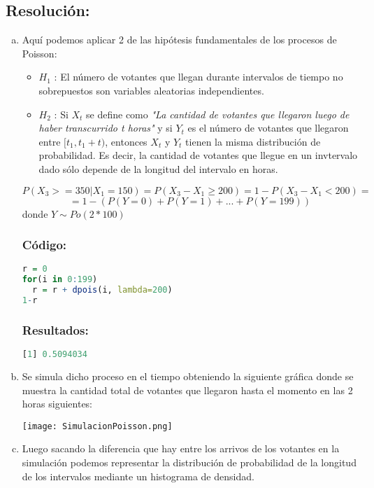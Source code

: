 \documentclass{article}
\begin{document}
\subsection*{Resolución:}


\begin{enumerate}[(a)] 
\item Aquí podemos aplicar 2 de las hipótesis fundamentales de los procesos de Poisson:
\begin{itemize}
    \item $H_1$ : El número de votantes que llegan durante intervalos de tiempo no sobrepuestos son variables aleatorias independientes.
    \item $H_2$ : Si $X_t$ se define como \textit{"La cantidad de votantes que llegaron luego de haber transcurrido t horas"} y si $Y_t$ es el número de votantes que llegaron entre $[t_1,t_1 + t)$, entonces $X_t$ y $Y_t$ tienen la misma distribución de probabilidad. Es decir, la cantidad de votantes que llegue en un invtervalo dado sólo depende de la longitud del intervalo en horas.
\end{itemize}

$$P(X_3 >= 350 | X_1 = 150) = P(X_3 - X_1 \geq 200) = 1 - P(X_3 - X_1 < 200) =$$ $$ = 1 - (P(Y = 0) + P(Y = 1) + ... + P(Y = 199))$$ donde $Y \sim Po(2 * 100)$
\subsubsection*{Código:}
\begin{lstlisting}[language=R]
r = 0
for(i in 0:199)
  r = r + dpois(i, lambda=200)
1-r
\end{lstlisting}

\subsubsection*{Resultados:}
\begin{lstlisting}[language=R]
[1] 0.5094034
\end{lstlisting}
\item Se simula dicho proceso en el tiempo obteniendo la siguiente gráfica donde se muestra la cantidad total de votantes que llegaron hasta el momento en las 2 horas siguientes:


\texttt{[image: SimulacionPoisson.png]}

\item

Luego sacando la diferencia que hay entre los arrivos de los votantes en la simulación podemos representar la distribución de probabilidad de la longitud de los intervalos mediante un histograma de densidad.
\pagebreak

\end{enumerate}
\end{document}
